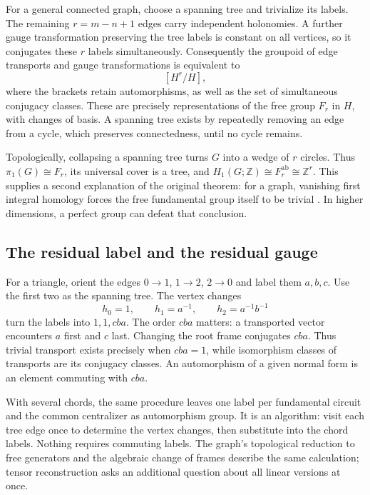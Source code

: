 \documentclass[11pt]{article}
\theoremstyle{definition}
\theoremstyle{remark}
\newcommand{\Z}{\mathbb Z}
\begin{document}
For a general connected graph, choose a spanning tree and trivialize its labels. The remaining \(r=m-n+1\) edges carry independent holonomies. A further gauge transformation preserving the tree labels is constant on all vertices, so it conjugates these \(r\) labels simultaneously. Consequently the groupoid of edge transports and gauge transformations is equivalent to
\[
 [H^r/H],
\]
where the brackets retain automorphisms, as well as the set of simultaneous conjugacy classes. These are precisely representations of the free group \(F_r\) in \(H\), with changes of basis. A spanning tree exists by repeatedly removing an edge from a cycle, which preserves connectedness, until no cycle remains.

Topologically, collapsing a spanning tree turns \(G\) into a wedge of \(r\) circles. Thus \(\pi_1(G)\cong F_r\), its universal cover is a tree, and
\(H_1(G;\Z)\cong F_r^{\mathrm{ab}}\cong\Z^r\). This supplies a second explanation of the original theorem: for a graph, vanishing first integral homology forces the free fundamental group itself to be trivial \cite{rootHatcher}. In higher dimensions, a perfect group can defeat that conclusion.

\subsection{The residual label and the residual gauge}
\label{sec:tree-gauge-calculus}

For a triangle, orient the edges $0\to1$, $1\to2$, $2\to0$ and label them $a,b,c$. Use the first two as the spanning tree. The vertex changes
\[
 h_0=1,\qquad h_1=a^{-1},\qquad h_2=a^{-1}b^{-1}
\]
turn the labels into $1,1,cba$. The order $cba$ matters: a transported vector encounters $a$ first and $c$ last. Changing the root frame conjugates $cba$. Thus trivial transport exists precisely when $cba=1$, while isomorphism classes of transports are its conjugacy classes. An automorphism of a given normal form is an element commuting with $cba$.

With several chords, the same procedure leaves one label per fundamental circuit and the common centralizer as automorphism group. It is an algorithm: visit each tree edge once to determine the vertex changes, then substitute into the chord labels. Nothing requires commuting labels. The graph's topological reduction to free generators and the algebraic change of frames describe the same calculation; tensor reconstruction asks an additional question about all linear versions at once.
\end{document}
